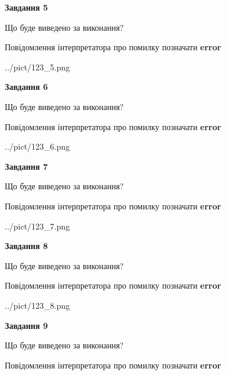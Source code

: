 \documentclass[11pt, ukrainian]{article}
\begin{document}
{\begin {large}
{\begin {center}\textbf{Завдання 5}\end {center}}\par
Що буде виведено за виконання? \par
Повідомлення інтерпретатора про помилку позначати \textbf{error}

\begin{center}
	{../pict/123_5.png}
\end{center}
\newpage

{\begin {center}\textbf{Завдання 6}\end {center}}\par
Що буде виведено за виконання? \par
Повідомлення інтерпретатора про помилку позначати \textbf{error}

\begin{center}
	{../pict/123_6.png}
\end{center}
\newpage

{\begin {center}\textbf{Завдання 7}\end {center}}\par
Що буде виведено за виконання? \par
Повідомлення інтерпретатора про помилку позначати \textbf{error}

\begin{center}
	{../pict/123_7.png}
\end{center}
\newpage

{\begin {center}\textbf{Завдання 8}\end {center}}\par
Що буде виведено за виконання? \par
Повідомлення інтерпретатора про помилку позначати \textbf{error}

\begin{center}
	{../pict/123_8.png}
\end{center}
\newpage

{\begin {center}\textbf{Завдання 9}\end {center}}\par
Що буде виведено за виконання? \par
Повідомлення інтерпретатора про помилку позначати \textbf{error}


\end{large}}
\end{document}
